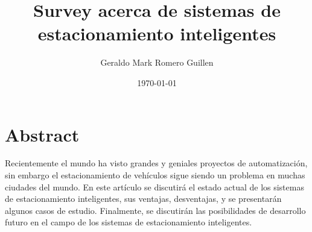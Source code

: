 \documentclass{article}
\begin{document}
\title{Survey acerca de sistemas de estacionamiento inteligentes}
\author{Geraldo Mark Romero Guillen}
\date{\today}

\maketitle

\section*{Abstract}
Recientemente el mundo ha visto grandes y geniales proyectos de automatización,
sin embargo el estacionamiento de vehículos sigue siendo un problema en muchas
ciudades del mundo. En este artículo se discutirá el estado actual de los
sistemas de estacionamiento inteligentes, sus ventajas, desventajas, y se
presentarán algunos casos de estudio. Finalmente, se discutirán las
posibilidades de desarrollo futuro en el campo de los sistemas de estacionamiento
inteligentes.
\end{document}
